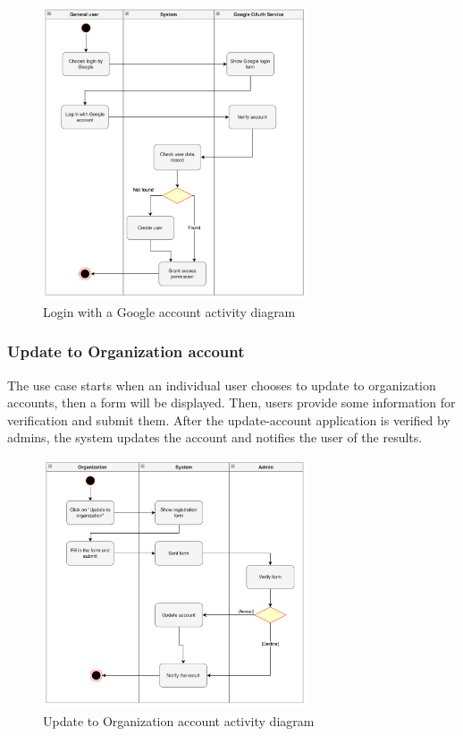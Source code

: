 \begin{figure}[H]
  \centering
  \includegraphics[width=0.7\textwidth]{Figures/login_gg.png}
  \caption{Login with a Google account activity diagram}
  \label{fig:login-google}
\end{figure}

\subsubsection{Update to Organization account}

The use case starts when an individual user chooses to update to organization accounts, then a form will be displayed. Then, users provide some information for verification and submit them. After the update-account application is verified by admins, the system updates the account and notifies the user of the results.

\begin{figure}[H]
  \centering
  \includegraphics[width=0.7\textwidth]{Figures/update_org.png}
  \caption{Update to Organization account activity diagram}
  \label{fig:update-org}
\end{figure}

